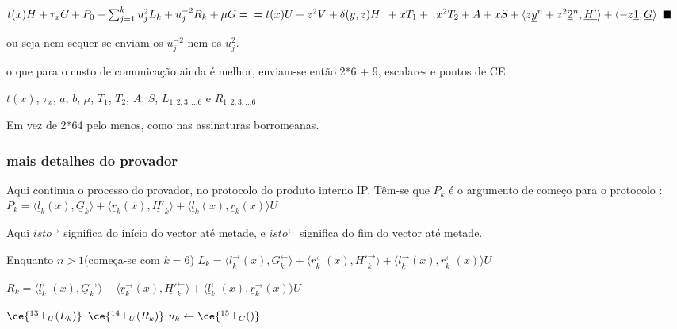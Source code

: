 $t(x) H + \bold{\tau}_x G + P_0 - \sum_{j=1}^{k} u_{j}^{2}L_k + u_{j}^{-2}R_k + \mu G=\\= t(x) U + z^2 V + \delta(y, z) H \enspace+ x T_1 +\enspace x^2 T_2 + A + x S + \langle z\underline{y}^n + z^2\underline{2}^n,\underline{H'}\rangle + \langle -z\underline{1},\underline{G}\rangle$
$\hspace*{\fill} \blacksquare$

ou seja nem sequer se enviam os $u_{j}^{-2}$ nem os $u_{j}^{2}$.

o que para o custo de comunicação ainda é melhor, enviam-se então 2*6 + 9, escalares e pontos de CE:

$t(x)$, $\tau_x$, $a$, $b$, $\mu$, $T_1$, $T_2$, $A$, $S$, $L_{1,2,3,...6}$ e $R_{1,2,3,...6}$ 


Em vez de 2*64 pelo menos, como nas assinaturas borromeanas. 
\newpage
\subsubsection{mais detalhes do provador}
\label{sec:bullet_detalhes}

Aqui continua o processo do provador, no protocolo do produto interno IP. Têm-se que $P_k$ é o argumento de começo para o protocolo :\newline
$P_k = \langle \underline{l}_k(x),\underline{G}_k\rangle + \langle \underline{r}_k(x),\underline{H'}_k\rangle + \langle \underline{l}_k(x), \underline{r}_k(x)\rangle U$

Aqui $isto^{\rightarrow}$ significa do início do vector até metade, e $isto^{\leftarrow}$ significa do fim do vector até metade.

Enquanto $n>1$\quad\quad\quad(começa-se com $k=6$)\newline
$L_k = \langle \underline{l}^{\rightarrow}_{k}(x),\underline{G}^{\leftarrow}_{k}\rangle + \langle \underline{r}^{\leftarrow}_{k}(x),\underline{H'}^{\rightarrow}_{k}\rangle + \langle \underline{l}^{\rightarrow}_{k}(x), \underline{r}^{\leftarrow}_{k}(x)\rangle U$

$R_k = \langle \underline{l}^{\leftarrow}_{k}(x),\underline{G}^{\rightarrow}_{k}\rangle + \langle \underline{r}^{\rightarrow}_{k}(x),\underline{H'}^{\leftarrow}_{k}\rangle + \langle \underline{l}^{\leftarrow}_{k}(x), \underline{r}^{\rightarrow}_{k}(x)\rangle U$

\hspace*{\fill} $\ce{^{13}_{\ }\bot_U(L_k)}$ \newline
\hspace*{\fill} $\ce{^{14}_{\ }\bot_U(R_k)}$ \newline
$u_{k}\leftarrow \ce{^{15}_{\ }\bot_C()}$\newline

